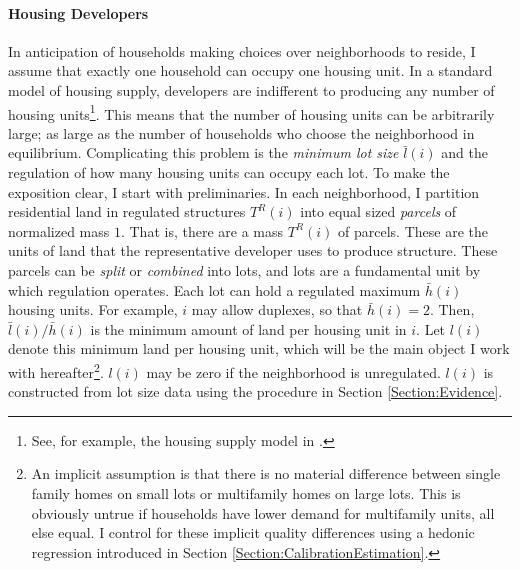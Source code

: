 \documentclass[11pt]{article}
\begin{document}
	\paragraph*{Housing Developers}   
	In anticipation of households making choices over neighborhoods to reside, I assume that exactly one household can occupy one housing unit. In a standard model of housing supply, developers are indifferent to producing any number of housing units\footnote{See, for example, the housing supply model in \cite{BSH}.}. This means that the number of housing units can be arbitrarily large; as large as the number of households who choose the neighborhood in equilibrium. Complicating this problem is the \textit{minimum lot size} $\bar{l}(i)$ and the regulation of how many housing units can occupy each lot. To make the exposition clear, I start with preliminaries. In each neighborhood, I partition residential land in regulated structures $T^{R}(i)$ into equal sized \textit{parcels} of normalized mass $1$. That is, there are a mass $T^{R}(i)$ of parcels. These are the units of land that the representative developer uses to produce structure. These parcels can be \textit{split} or \textit{combined} into lots, and lots are a fundamental unit by which regulation operates. Each lot can hold a regulated maximum $\bar{h}(i)$ housing units. For example, $i$ may allow duplexes, so that $\bar{h}(i) = 2$. Then, $\bar{l}(i)/\bar{h}(i)$ is the minimum amount of land per housing unit in $i$. Let $l(i)$ denote this minimum land per housing unit, which will be the main object I work with hereafter\footnote{An implicit assumption is that there is no material difference between single family homes on small lots or multifamily homes on large lots. This is obviously untrue if households have lower demand for multifamily units, all else equal. I control for these implicit quality differences using a hedonic regression introduced in Section \ref{Section:CalibrationEstimation}.}. $l(i)$ may be zero if the neighborhood is unregulated. $l(i)$ is constructed from lot size data using the procedure in Section \ref{Section:Evidence}. 
\end{document}
